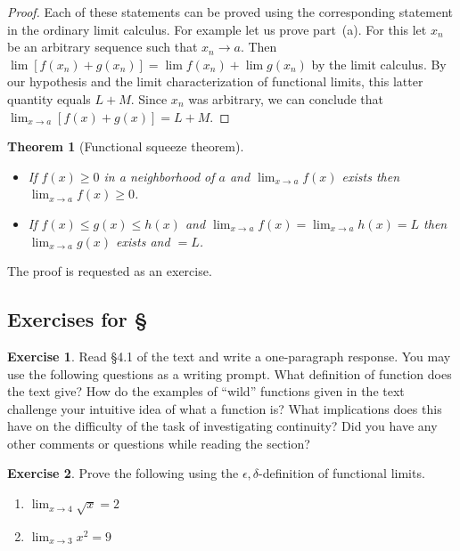 \documentclass[11pt,oneside]{amsbook}
\theoremstyle{definition}
\newtheorem{exerc}{Exercise}[section]
\theoremstyle{plain}
\newtheorem{theorem}{Theorem}[section]
\theoremstyle{definition}
\theoremstyle{remark}
\numberwithin{equation}{section}
\numberwithin{figure}{section}
\begin{document}
\begin{proof}
  Each of these statements can be proved using the corresponding statement in the ordinary limit calculus. For example let us prove part~(a). For this let $x_n$ be an arbitrary sequence such that $x_n\to a$. Then $\lim[f(x_n)+g(x_n)]=\lim f(x_n)+\lim g(x_n)$ by the limit calculus. By our hypothesis and the limit characterization of functional limits, this latter quantity equals $L+M$. Since $x_n$ was arbitrary, we can conclude that $\lim_{x\to a}[f(x)+g(x)]=L+M$.
\end{proof}

\begin{theorem}[Functional squeeze theorem]\
  \begin{itemize}
  \item If $f(x)\geq0$ in a neighborhood of $a$ and $\lim_{x\to a}f(x)$ exists then $\lim_{x\to a}f(x)\geq0$.
  \item If $f(x)\leq g(x)\leq h(x)$ and $\lim_{x\to a}f(x)=\lim_{x\to a}h(x)=L$ then $\lim_{x\to a}g(x)$ exists and $=L$.
  \end{itemize}
\end{theorem}

The proof is requested as an exercise.

\newpage
\subsection*{Exercises for \S \thesection}

\begin{exerc}
  Read \S4.1 of the text and write a one-paragraph response. You may use the following questions as a writing prompt. What definition of function does the text give? How do the examples of ``wild'' functions given in the text challenge your intuitive idea of what a function is? What implications does this have on the difficulty of the task of investigating continuity? Did you have any other comments or questions while reading the section?
\end{exerc}

\begin{exerc}
  Prove the following using the $\epsilon,\delta$-definition of functional limits.
  \begin{enumerate}
    \item $\lim_{x\to4}\sqrt{x}=2$
    \item $\lim_{x\to3}x^2=9$
  \end{enumerate}
\end{exerc}
\end{document}
